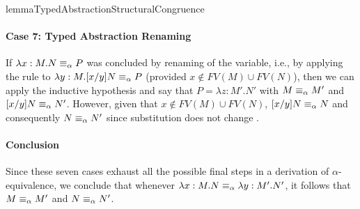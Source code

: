 \begin{longproof}{lemmaTypedAbstractionStructuralCongruence}
\paragraph{Case 7: Typed Abstraction Renaming}
If $\lambda x:M.N \equiv_\alpha P$ was concluded by renaming of the variable, i.e., by applying the rule to $\lambda y:M.[x/y]N \equiv_\alpha P$ (provided $x \not\in FV(M) \cup FV(N)$), then we can apply the inductive hypothesis and say that $P=\lambda z:M'.N'$ with $M \equiv_\alpha M'$ and $[x/y]N \equiv_\alpha N'$. However, given that $x \not\in FV(M) \cup FV(N)$, $[x/y]N \equiv_\alpha N$ and consequently $N \equiv_\alpha N'$ since substitution does not change \alphaequivalence.

\paragraph{Conclusion}
Since these seven cases exhaust all the possible final steps in a derivation 
of $\alpha$-equivalence, we conclude that whenever $\lambda x:M.N \equiv_\alpha \lambda y:M'.N'$, it 
follows that $M \equiv_\alpha M'$ and $N \equiv_\alpha N'$.
\end{longproof}


%
%

